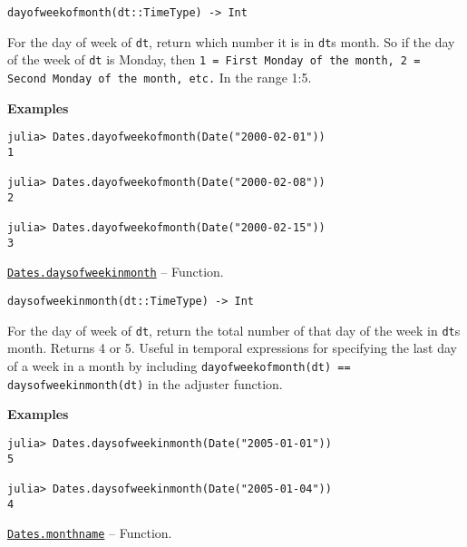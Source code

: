 \begin{adjustwidth}{2em}{0pt}


\begin{verbatim}
dayofweekofmonth(dt::TimeType) -> Int
\end{verbatim}

For the day of week of \texttt{dt}, return which number it is in \texttt{dt}{\textquotesingle}s month. So if the day of the week of \texttt{dt} is Monday, then \texttt{1 = First Monday of the month, 2 = Second Monday of the month, etc.} In the range 1:5.

\textbf{Examples}


\begin{verbatim}
julia> Dates.dayofweekofmonth(Date("2000-02-01"))
1

julia> Dates.dayofweekofmonth(Date("2000-02-08"))
2

julia> Dates.dayofweekofmonth(Date("2000-02-15"))
3
\end{verbatim}



\end{adjustwidth}
\hypertarget{3276636057341185884}{}
\hyperlink{3276636057341185884}{\texttt{Dates.daysofweekinmonth}}  -- {Function.}

\begin{adjustwidth}{2em}{0pt}


\begin{verbatim}
daysofweekinmonth(dt::TimeType) -> Int
\end{verbatim}

For the day of week of \texttt{dt}, return the total number of that day of the week in \texttt{dt}{\textquotesingle}s month. Returns 4 or 5. Useful in temporal expressions for specifying the last day of a week in a month by including \texttt{dayofweekofmonth(dt) == daysofweekinmonth(dt)} in the adjuster function.

\textbf{Examples}


\begin{verbatim}
julia> Dates.daysofweekinmonth(Date("2005-01-01"))
5

julia> Dates.daysofweekinmonth(Date("2005-01-04"))
4
\end{verbatim}



\end{adjustwidth}
\hypertarget{16585759639636493546}{}
\hyperlink{16585759639636493546}{\texttt{Dates.monthname}}  -- {Function.}

